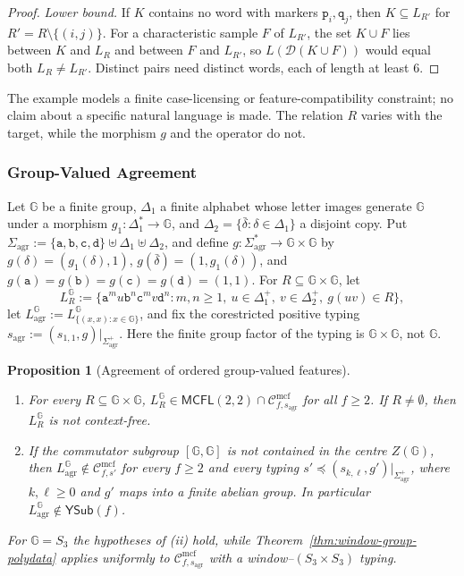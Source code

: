 \documentclass[11pt]{article}
\numberwithin{equation}{section}
\theoremstyle{plain}
\newtheorem{proposition}[theorem]{Proposition}
\theoremstyle{definition}
\theoremstyle{remark}
\newcommand{\Cmcf}[2]{\mathcal{C}^{\mathrm{mcf}}_{#1,#2}}
\newcommand{\YSub}[1]{\mathsf{YSub}(#1)}
\theoremstyle{plain}
\begin{document}
\begin{proof}
\emph{Lower bound.}  If $K$ contains no word with markers $\mathtt p_i,\mathtt q_j$,
then $K\subseteq L_{R'}$ for $R'=R\setminus\{(i,j)\}$.  For a characteristic sample $F$
of $L_{R'}$, the set $K\cup F$ lies between $K$ and $L_R$ and between $F$ and
$L_{R'}$, so $L(\mathcal D(K\cup F))$ would equal both $L_R\ne L_{R'}$.  Distinct pairs
need distinct words, each of length at least $6$.
\end{proof}

The example models a finite case-licensing or feature-compatibility constraint; no
claim about a specific natural language is made.  The relation $R$ varies with the
target, while the morphism $g$ and the operator do not.

\subsubsection{Group-Valued Agreement}
\label{app:group-agreement}

Let ${\mathbb G}$ be a finite group, $\Delta_1$ a finite alphabet whose letter
images generate ${\mathbb G}$ under a morphism $g_1:\Delta_1^*\to {\mathbb G}$, and
$\Delta_2=\{\bar\delta:\delta\in\Delta_1\}$ a disjoint copy.  Put
$\Sigma_{\mathrm{agr}}:=\{\mathtt a,\mathtt b,\mathtt c,\mathtt d\}
\uplus\Delta_1\uplus\Delta_2$, and define
$g:\Sigma_{\mathrm{agr}}^*\to {\mathbb G}\times {\mathbb G}$ by
$g(\delta)=(g_1(\delta),1)$, $g(\bar\delta)=(1,g_1(\delta))$,
and $g(\mathtt a)=g(\mathtt b)=g(\mathtt c)=g(\mathtt d)=(1,1)$.
For $R\subseteq {\mathbb G}\times {\mathbb G}$, let
\[
 L_R^{\mathbb G}:=\{\mathtt a^m u\mathtt b^n\mathtt c^m v\mathtt d^n:
     m,n\ge1,\ u\in\Delta_1^+,\ v\in\Delta_2^+,\ g(uv)\in R\},
\]
let $L_{\mathrm{agr}}^{\mathbb G}:=L_{\{(x,x):x\in {\mathbb G}\}}^{\mathbb G}$, and fix the
corestricted positive typing
$s_{\mathrm{agr}}:=(s_{1,1},g)|_{\Sigma_{\mathrm{agr}}^+}$.
Here the finite group factor of the typing is ${\mathbb G}\times {\mathbb G}$, not ${\mathbb G}$.

\begin{proposition}[Agreement of ordered group-valued features]
\label{prop:group-agreement}
\begin{enumerate}[label=\textup{(\roman*)},leftmargin=*]
\item For every $R\subseteq {\mathbb G}\times {\mathbb G}$,
$L_R^{\mathbb G}\in\mathsf{MCFL}(2,2)\cap\Cmcf{f}{s_{\mathrm{agr}}}$
for all $f\ge2$.  If $R\ne\emptyset$, then $L_R^{\mathbb G}$ is not context-free.
\item If the commutator subgroup $[{\mathbb G},{\mathbb G}]$ is not contained in the centre
$Z({\mathbb G})$, then $L_{\mathrm{agr}}^{\mathbb G}\notin\Cmcf{f}{s'}$ for every $f\ge2$
and every typing $s'\preceq(s_{k,\ell},g')|_{\Sigma_{\mathrm{agr}}^+}$,
where $k,\ell\ge0$ and $g'$ maps into a finite abelian group.
In particular $L_{\mathrm{agr}}^{\mathbb G}\notin\YSub{f}$.
\end{enumerate}
For ${\mathbb G}=S_3$ the hypotheses of \textup{(ii)} hold, while
Theorem~\ref{thm:window-group-polydata} applies uniformly to
$\Cmcf{f}{s_{\mathrm{agr}}}$ with a window--$(S_3\times S_3)$ typing.
\end{proposition}
\end{document}
